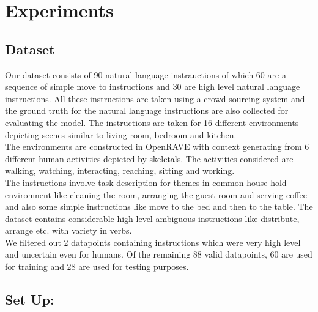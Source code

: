 \section{Experiments}
\subsection{Dataset}
Our dataset consists of 90 natural language instrauctions of which 60 are a sequence of simple move to instructions and 30 are high level natural language instructions. All these instructions are taken using a \href{http://52.25.65.189:9000/#/getFeedback}{crowd sourcing system} and the ground truth for the natural language instructions are also collected for evaluating the model. The instructions are taken for 16 different environments depicting scenes similar to living room, bedroom and kitchen. \\
The environments are constructed in OpenRAVE with context generating from 6 different human activities depicted by skeletals. The activities considered are walking, watching, interacting, reaching, sitting and working. \\
The instructions involve task description for themes in common house-hold enviromnent like cleaning the room, arranging the guest room and serving coffee and also some simple instructions like move to the bed and then to the table. The dataset contains considerable high level ambiguous instructions like distribute, arrange etc. with variety in verbs.\\
We filtered out 2 datapoints containing instructions which were very high level and uncertain even for  humans. Of the remaining 88 valid datapoints, 60 are used for training and 28 are used for testing purposes.  


\subsection{Set Up:}
